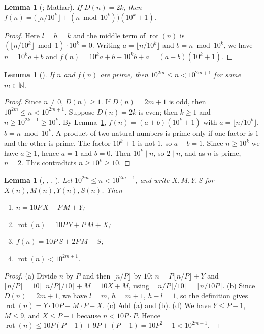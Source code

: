 \documentclass[11pt]{amsart}
\theoremstyle{plain}
\newtheorem{lemma}[theorem]{Lemma}
\theoremstyle{definition}
\newcommand{\N}{\mathbb{N}}
\DeclareMathOperator{\rot}{rot}
\newcommand{\nd}{D}
\begin{document}
\begin{lemma}[; Mathar]\label{lem:even}
If $\nd(n)=2k$, then $f(n)=\bigl(\lfloor n/10^k\rfloor+(n\bmod10^k)\bigr)(10^k+1)$.
\end{lemma}

\begin{proof}
Here $l=h=k$ and the middle term of $\rot(n)$ is $(\lfloor n/10^k\rfloor\bmod1)\cdot10^k=0$. Writing $a=\lfloor n/10^k\rfloor$ and $b=n\bmod10^k$, we have $n=10^ka+b$ and $f(n)=10^ka+b+10^kb+a=(a+b)(10^k+1)$.
\end{proof}

\begin{lemma}[]\label{lem:odd}
If $n$ and $f(n)$ are prime, then $10^{2m}\le n<10^{2m+1}$ for some $m\in\N$.
\end{lemma}

\begin{proof}
Since $n\ne0$, $\nd(n)\ge1$. If $\nd(n)=2m+1$ is odd, then $10^{2m}\le n<10^{2m+1}$. Suppose $\nd(n)=2k$ is even; then $k\ge1$ and $n\ge10^{2k-1}\ge10^k$. By Lemma~\ref{lem:even}, $f(n)=(a+b)(10^k+1)$ with $a=\lfloor n/10^k\rfloor$, $b=n\bmod10^k$. A product of two natural numbers is prime only if one factor is $1$ and the other is prime. The factor $10^k+1$ is not $1$, so $a+b=1$. Since $n\ge10^k$ we have $a\ge1$, hence $a=1$ and $b=0$. Then $10^k\mid n$, so $2\mid n$, and as $n$ is prime, $n=2$. This contradicts $n\ge10^k\ge10$.
\end{proof}

\begin{lemma}[, , , ]\label{lem:shape}
Let $10^{2m}\le n<10^{2m+1}$, and write $X,M,Y,S$ for $X(n),M(n),Y(n),S(n)$. Then
\begin{enumerate}
\item[(a)] $n=10P\,X+P\,M+Y$;
\item[(b)] $\rot(n)=10P\,Y+P\,M+X$;
\item[(c)] $f(n)=10P\,S+2P\,M+S$;
\item[(d)] $\rot(n)<10^{2m+1}$.
\end{enumerate}
\end{lemma}

\begin{proof}
(a) Divide $n$ by $P$ and then $\lfloor n/P\rfloor$ by $10$: $n=P\lfloor n/P\rfloor+Y$ and $\lfloor n/P\rfloor=10\lfloor\lfloor n/P\rfloor/10\rfloor+M=10X+M$, using $\lfloor\lfloor n/P\rfloor/10\rfloor=\lfloor n/10P\rfloor$.
(b) Since $\nd(n)=2m+1$, we have $l=m$, $h=m+1$, $h-l=1$, so the definition gives $\rot(n)=Y\cdot10P+M\cdot P+X$.
(c) Add (a) and (b).
(d) We have $Y\le P-1$, $M\le9$, and $X\le P-1$ because $n<10P\cdot P$. Hence $\rot(n)\le10P(P-1)+9P+(P-1)=10P^2-1<10^{2m+1}$.
\end{proof}
\end{document}
